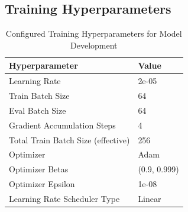 \documentclass[12pt]{extarticle}
\begin{document}
\subsection{Training Hyperparameters}
\begin{table}[h]
\centering
\begin{tabular}{|l|l|}
\hline
\textbf{Hyperparameter}              & \textbf{Value} \\ \hline
Learning Rate                        & 2e-05          \\ \hline
Train Batch Size                     & 64             \\ \hline
Eval Batch Size                      & 64             \\ \hline
Gradient Accumulation Steps          & 4              \\ \hline
Total Train Batch Size (effective)   & 256            \\ \hline
Optimizer                            & Adam           \\ \hline
Optimizer Betas                      & (0.9, 0.999)   \\ \hline
Optimizer Epsilon                    & 1e-08          \\ \hline
Learning Rate Scheduler Type         & Linear         \\ \hline
\end{tabular}
\caption{Configured Training Hyperparameters for Model Development}
\label{tab:hyperparameters}
\end{table}
\end{document}
